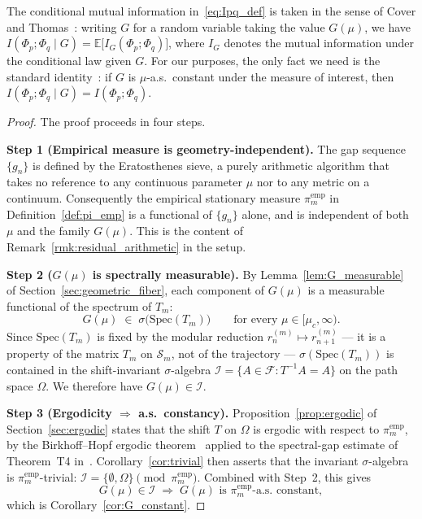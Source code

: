 The conditional mutual information in~\eqref{eq:Ipq_def} is taken in
the sense of Cover and Thomas~\cite[\S~2.5]{CoverThomas2006}: writing
$G$ for a random variable taking the value $G(\mu)$, we have
$I(\Phi_p; \Phi_q \mid G) = \mathbb{E}\bigl[I_{G}(\Phi_p; \Phi_q)\bigr]$,
where $I_{G}$ denotes the mutual information under the conditional
law given $G$. For our purposes, the only fact we need is the standard
identity~\cite[Eq.~(2.66)]{CoverThomas2006}: if $G$ is $\mu$-a.s.\
constant under the measure of interest, then
$I(\Phi_p; \Phi_q \mid G) = I(\Phi_p; \Phi_q)$.

\begin{proof}
The proof proceeds in four steps.

\textbf{Step 1 (Empirical measure is geometry-independent).}
The gap sequence $\{g_n\}$ is defined by the Eratosthenes sieve, a
purely arithmetic algorithm that takes no reference to any continuous
parameter $\mu$ nor to any metric on a continuum. Consequently the
empirical stationary measure
$\pi_m^{\mathrm{emp}}$ in Definition~\ref{def:pi_emp} is a functional
of $\{g_n\}$ alone, and is independent of both~$\mu$ and the family
$G(\mu)$. This is the content of Remark~\ref{rmk:residual_arithmetic}
in the setup.

\textbf{Step 2 ($G(\mu)$ is spectrally measurable).}
By Lemma~\ref{lem:G_measurable} of Section~\ref{sec:geometric_fiber},
each component of $G(\mu)$ is a measurable functional of the spectrum
of $T_m$:
\[
  G(\mu) \;\in\; \sigma\bigl(\mathrm{Spec}(T_m)\bigr)
  \qquad \text{for every } \mu \in [\mu_c, \infty).
\]
Since $\mathrm{Spec}(T_m)$ is fixed by the modular reduction
$r_n^{(m)} \mapsto r_{n+1}^{(m)}$ --- it is a property of the matrix
$T_m$ on $\mathcal{S}_m$, not of the trajectory ---
$\sigma(\mathrm{Spec}(T_m))$ is contained in the shift-invariant
$\sigma$-algebra $\mathcal{I} = \{A \in \mathcal{F} : T^{-1}A = A\}$
on the path space $\Omega$. We therefore have
$G(\mu) \in \mathcal{I}$.

\textbf{Step 3 (Ergodicity $\Rightarrow$ a.s.\ constancy).}
Proposition~\ref{prop:ergodic} of Section~\ref{sec:ergodic} states
that the shift $T$ on $\Omega$ is ergodic with respect to
$\pi_m^{\mathrm{emp}}$, by the Birkhoff--Hopf ergodic
theorem~\cite[Thm.~1.6]{Walters1982} applied to the spectral-gap
estimate of Theorem~T4 in~\cite[Ch.~7]{PT_Monograph}.
Corollary~\ref{cor:trivial} then asserts that the invariant
$\sigma$-algebra is $\pi_m^{\mathrm{emp}}$-trivial:
$\mathcal{I} = \{\emptyset, \Omega\} \pmod{\pi_m^{\mathrm{emp}}}$.
Combined with Step~2, this gives
\[
  G(\mu) \in \mathcal{I}
  \;\Longrightarrow\;
  G(\mu) \text{ is } \pi_m^{\mathrm{emp}}\text{-a.s.\ constant},
\]
which is Corollary~\ref{cor:G_constant}.


\end{proof}
